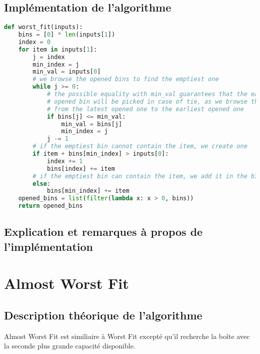 \documentclass{article}
\begin{document}
\subsection{Implémentation de l'algorithme}
\begin{lstlisting}[language=Python, frame=single]
def worst_fit(inputs):
    bins = [0] * len(inputs[1])
    index = 0
    for item in inputs[1]:
        j = index
        min_index = j
        min_val = inputs[0]
        # we browse the opened bins to find the emptiest one
        while j >= 0:
            # the possible equality with min_val guarantees that the earliest
            # opened bin will be picked in case of tie, as we browse the bins
            # from the latest opened one to the earliest opened one
            if bins[j] <= min_val:
                min_val = bins[j]
                min_index = j
            j -= 1
        # if the emptiest bin cannot contain the item, we create one
        if item + bins[min_index] > inputs[0]:
            index += 1
            bins[index] += item
        # if the emptiest bin can contain the item, we add it in the bin
        else:
            bins[min_index] += item
    opened_bins = list(filter(lambda x: x > 0, bins))
    return opened_bins
\end{lstlisting}

\subsection{Explication et remarques à propos de l'implémentation}




\section{Almost Worst Fit}

\subsection{Description théorique de l'algorithme}
Almost Worst Fit est similiaire à Worst Fit excepté qu'il recherche la boîte avec la seconde plus grande capacité disponible.
\end{document}
